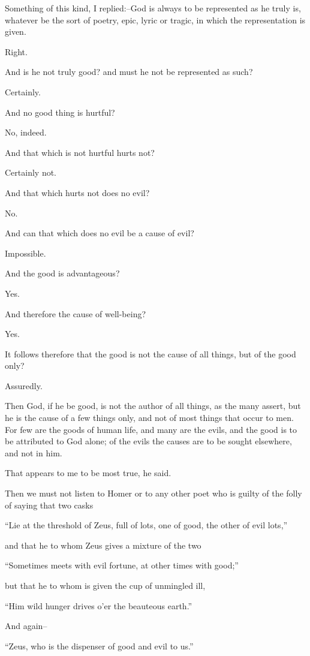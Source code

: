 Something of this kind, I replied:--God is always to be represented as
he truly is, whatever be the sort of poetry, epic, lyric or tragic, in
which the representation is given.

Right.

And is he not truly good? and must he not be represented as such?

Certainly.

And no good thing is hurtful?

No, indeed.

And that which is not hurtful hurts not?

Certainly not.

And that which hurts not does no evil?

No.

And can that which does no evil be a cause of evil?

Impossible.

And the good is advantageous?

Yes.

And therefore the cause of well-being?

Yes.

It follows therefore that the good is not the cause of all things, but
of the good only?

Assuredly.

Then God, if he be good, is not the author of all things, as the many
assert, but he is the cause of a few things only, and not of most things
that occur to men. For few are the goods of human life, and many are the
evils, and the good is to be attributed to God alone; of the evils the
causes are to be sought elsewhere, and not in him.

That appears to me to be most true, he said.

Then we must not listen to Homer or to any other poet who is guilty of
the folly of saying that two casks

``Lie at the threshold of Zeus, full of lots, one of good, the other of
evil lots,''

and that he to whom Zeus gives a mixture of the two

``Sometimes meets with evil fortune, at other times with good;''

but that he to whom is given the cup of unmingled ill,

``Him wild hunger drives o'er the beauteous earth.''

And again--

``Zeus, who is the dispenser of good and evil to us.''

